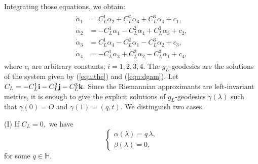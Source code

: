 \documentclass [12pt,a4paper]{amsart}
\newcommand{\mH}{\mathbb{H}}
\newcommand{\bi}{{\bf i}}
\newcommand{\bj}{{\bf j}}
\newcommand{\bk}{{\bf k}}
\theoremstyle{plain}
\theoremstyle{definition}
\numberwithin{equation}{section}
\begin{document}
Integrating those equations, we obtain:
\begin{align}\label{equ:dgam}
\begin{split}
\dot\alpha_1&=C_L^1\alpha_2+C_L^2\alpha_3+C_L^3\alpha_4+c_1,\\
\dot\alpha_2&=-C_L^1\alpha_1-C_L^2\alpha_4+C_L^3\alpha_3+c_2,\\
\dot\alpha_3&=C_L^1\alpha_4-C_L^2\alpha_1-C_L^3\alpha_2+c_3,\\
\dot\alpha_4&=-C_L^1\alpha_3+C_L^2\alpha_2-C_L^3\alpha_1+c_4,
\end{split}
\end{align}
where $c_i$ are arbitrary constants,  $i=1, 2, 3, 4.$ The $g_L$-geodesics are the solutions of the system given by 
(\ref{equ:the}) and (\ref{equ:dgam}).
Let $C_L=-C_L^1\bi-C_L^2\bj-C_L^3\bk.$ 
Since the Riemannian approximants are left-invariant metrics, it is enough to give the explicit solutions of $g_L$-geodesics $\gamma(\lambda)$ such that $\gamma(0)=O$ and $\gamma(1)=(q,t).$ We distinguish two cases.

\smallskip
(I) If $C_L=0,$
we have
\begin{equation*}
\begin{cases}
\alpha(\lambda) =q\,\lambda,\\
\beta(\lambda)=0,
%
\end{cases}
\end{equation*}
for some $q\in\mH.$ 
\end{document}
